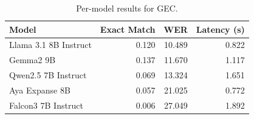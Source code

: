 \begin{table}[t]
\centering
\caption{Per-model results for GEC.}
\label{tab:appendix-gec-analysis}
\begin{tabular}{lrrr}
\toprule
Model & Exact Match & WER & Latency (s) \\
\midrule
Llama 3.1 8B Instruct & 0.120 & 10.489 & 0.822 \\
Gemma2 9B & 0.137 & 11.670 & 1.117 \\
Qwen2.5 7B Instruct & 0.069 & 13.324 & 1.651 \\
Aya Expanse 8B & 0.057 & 21.025 & 0.772 \\
Falcon3 7B Instruct & 0.006 & 27.049 & 1.892 \\
\bottomrule
\end{tabular}
\end{table}
